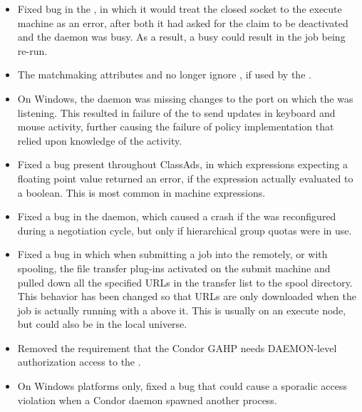 \begin{itemize}
\item Fixed bug in the , in which it would treat 
the closed socket to the execute machine as an error,
after both it had asked for the claim to be deactivated and the 
 daemon was busy.  
As a result, a busy  could result in the job being re-run.

\item The matchmaking attributes 
 and  
no longer ignore , if used by the .

\item On Windows, the  daemon was missing changes to the
port on which the  was listening.
This resulted in failure of the  to send updates in 
keyboard and mouse activity,
further causing the failure of policy implementation that relied upon 
knowledge of the activity.

\item Fixed a bug present throughout ClassAds,
in which expressions expecting a floating point value returned an error,
if the expression actually evaluated to a boolean.
This is most common in machine  expressions.

\item Fixed a bug in the  daemon,
which caused a crash if the  was reconfigured 
during a negotiation cycle, 
but only if hierarchical group quotas were in use.

\item Fixed a bug in which when submitting a job into the 
remotely, or with spooling, 
the file transfer plug-ins activated on the submit machine 
and pulled down all the specified URLs in the transfer list 
to the spool directory. 
This behavior has been changed so that URLs are only downloaded 
when the job is actually running with a  above it. 
This is usually on an execute node, but could also be in the local universe. 

\item Removed the requirement that the Condor GAHP needs DAEMON-level 
authorization access to the . 

\item On Windows platforms only, 
fixed a bug that could cause a sporadic access violation 
when a Condor daemon spawned another process.


\end{itemize}
